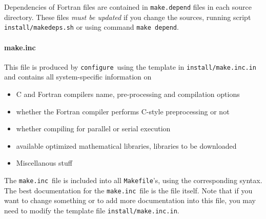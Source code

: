 \documentclass[12pt,a4paper]{article}
\def\configure{\texttt{configure}}
\def\make.inc{\texttt{make.inc}}
\def\Makefile{\texttt{Makefile}}
\begin{document}
Dependencies of Fortran files are contained in \texttt{make.depend} files
in each source directory. These files {\em must be updated} if you change
the sources, running script \texttt{install/makedeps.sh} or using command
\texttt{make depend}.

\paragraph{make.inc}
This file is produced by \configure\ using the template in
\texttt{install/make.inc.in} and contains all system-specific
information on
\begin{itemize}
\item C and Fortran compilers name, pre-processing and compilation options
\item whether the Fortran compiler performs C-style preprocessing or not
\item whether compiling for parallel or serial execution
\item available optimized mathematical libraries, libraries to be downloaded
\item Miscellanous stuff
\end{itemize}
The \make.inc\ file is included into all \Makefile's,
using the corresponding syntax. The best documentation for the
\make.inc\ file is the file itself. Note that if you want to
change something or to add more documentation into this file,
you may need to modify the template file \texttt{install/make.inc.in}.
\end{document}
